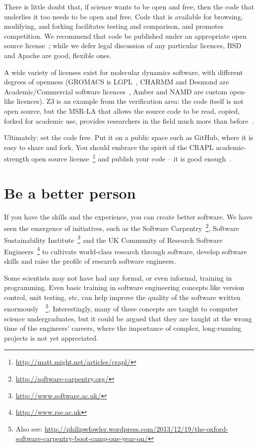 \documentclass[conference]{IEEEtran}
\begin{document}
There is little doubt that, if science wants to be open and free, then
the code that underlies it too needs to be open and free. Code that is
available for browsing, modifying, and forking facilitates testing and
comparison, and promotes competition. We recommend that code be
published under an appropriate open source license~\cite{osl}; while
we defer legal discussion of any particular licences, BSD and Apache
are good, flexible ones.

A wide variety of licenses exist for molecular dynamics software, with
different degrees of openness (GROMACS is LGPL~\cite{Hess2008},
CHARMM and Desmond are Academic/Commercial software
licences~\cite{Brooks2009,Bowers2006}, Amber and NAMD are custom
open-like licences). Z3 is an example from the verification area: the
code itself is not open source, but the MSR-LA that allows the source
code to be read, copied, forked for academic use, provides researchers
in the field much more than before~\cite{deMoura2012Z3open}.

Ultimately: set the code free. Put it on a public space such as GitHub, where it
is easy to share and fork. You should embrace the spirit of the CRAPL
academic-strength open source
license~\footnote{\url{http://matt.might.net/articles/crapl/}} and
publish your code -- it is good enough~\cite{barnes:2010}.


\section{Be a better person}

If you have the skills and the experience, you can create better
software. We have seen the emergence of initiatives, such as the Software
Carpentry~\footnote{\url{http://software-carpentry.org/}}, Software
Sustainability Institute~\footnote{\url{http://www.software.ac.uk/}}
and the UK Community of Research Software
Engineers~\footnote{\url{http://www.rse.ac.uk}} to cultivate
world-class research through software, develop software skills and
raise the profile of research software engineers.

Some scientists may not have had any formal, or even informal,
training in programming. Even basic training in software engineering
concepts like version control, unit testing, etc, can help improve the
quality of the software written
enormously~\cite{Wilson2014}~\footnote{Also see:
\url{http://philipwfowler.wordpress.com/2013/12/19/the-oxford-software-carpentry-boot-camp-one-year-on/}}.
Interestingly, many of these concepts are taught to computer science
undergraduates, but it could be argued that they are taught at the
wrong time of the engineers' careers, where the importance of complex,
long-running projects is not yet appreciated.
\end{document}
